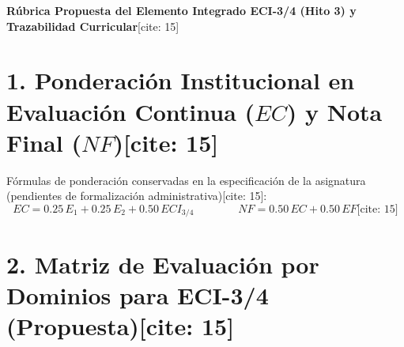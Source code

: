 \documentclass[11pt, a4paper, landscape]{article}
\begin{document}
\begin{center}
    \Large\textbf{\textcolor{ucbblue}{Rúbrica Propuesta del Elemento Integrado ECI-3/4 (Hito 3) y Trazabilidad Curricular}}[cite: 15]
\end{center}

\section*{1. Ponderación Institucional en Evaluación Continua ($EC$) y Nota Final ($NF$)[cite: 15]}
Fórmulas de ponderación conservadas en la especificación de la asignatura (pendientes de formalización administrativa)[cite: 15]:
\begin{equation*}
    \boxed{ EC = 0.25\,E_1 + 0.25\,E_2 + 0.50\,ECI_{3/4} } \qquad\qquad \boxed{ NF = 0.50\,EC + 0.50\,EF } \text{[cite: 15]}
\end{equation*}

\section*{2. Matriz de Evaluación por Dominios para ECI-3/4 (Propuesta)[cite: 15]}
\end{document}

